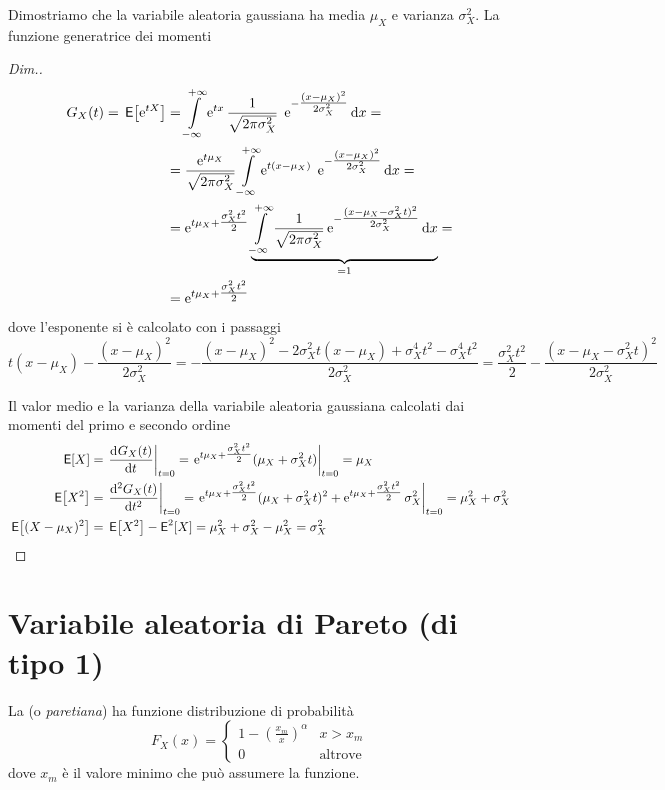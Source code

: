 Dimostriamo che la variabile aleatoria gaussiana ha media $\mu_X$ e varianza $\sigma^2_X$. La funzione generatrice dei momenti
\begin{proof}[Dim.]
\[\begin{split}G_X(t)=\,{\operatorname{\mathsf{E}}}\!\left[{\operatorname{e}^{t X}}\right]&=\int\limits_{-\infty}^{+\infty}{\operatorname{e}^{t x}\frac{1}{\sqrt{2\pi\sigma^2_X}}\;\operatorname{e}^{-\tfrac{(x-\mu_X)^2}{2\sigma^2_X}}}{\,\mathop{}\!\mathrm{d}{x}}=\\
&=\frac{\operatorname{e}^{t\mu_X}}{\sqrt{2\pi\sigma^2_X}}\int\limits_{-\infty}^{+\infty}{\operatorname{e}^{t (x-\mu_X)}\;\operatorname{e}^{-\tfrac{(x-\mu_X)^2}{2\sigma^2_X}}}{\,\mathop{}\!\mathrm{d}{x}}=\\
&=\operatorname{e}^{t\mu_X+\tfrac{\sigma^2_X t^2}{2}}\underbrace{\int\limits_{-\infty}^{+\infty}{\frac{1}{\sqrt{2\pi\sigma^2_X}}\operatorname{e}^{-\tfrac{(x-\mu_X-\sigma^2_X t)^2}{2\sigma^2_X}}}{\,\mathop{}\!\mathrm{d}{x}}}_{=1}=\\
&=\operatorname{e}^{t\mu_X+\tfrac{\sigma^2_X t^2}{2}}\end{split}\]
dove l'esponente si è calcolato con i passaggi
\[t(x-\mu_X)-\frac{(x-\mu_X)^2}{2\sigma^2_X}=-\frac{(x-\mu_X)^2-2\sigma^2_X t(x-\mu_X)+\sigma^4_X t^2-\sigma^4_X t^2}{2\sigma^2_X}=\frac{\sigma^2_X t^2}{2}-\frac{(x-\mu_X-\sigma^2_X t)^2}{2\sigma^2_X}\]

Il valor medio e la varianza della variabile aleatoria gaussiana calcolati dai momenti del primo e secondo ordine
\begin{equation}\begin{split}
\E{X}&=\restrict{\deriv{G_X(t)}{t}}{t=0}=\restrict{\e{t\mu_X+\tfrac{\sigma^2_X t^2}{2}}(\mu_X+\sigma^2_X t)}{t=0}=\mu_X
\\
\E{X^2}&=\restrict{\deriv[2]{G_X(t)}{t}}{t=0}=\restrict{\e{t\mu_X+\tfrac{\sigma^2_X t^2}{2}}(\mu_X+\sigma^2_X t)^2+\e{t\mu_X+\tfrac{\sigma^2_X t^2}{2}}\sigma^2_X}{t=0}=\mu^2_X+\sigma^2_X
\\\E{(X-\mu_X)^2}&=\E{X^2}-\Esp^2[X]=\mu^2_X+\sigma^2_X-\mu^2_X=\sigma^2_X
\end{split}
\end{equation}
\end{proof}

\section{Variabile aleatoria di Pareto (di tipo 1)}
La  (o \emph{paretiana}) ha funzione distribuzione di probabilità
\begin{equation}
	F_X(x) =
	\begin{cases}
		1-\left(\frac{x_m}{x}\right)^\alpha & x > x_m \\
		0 & \text{altrove}
	\end{cases}
\end{equation}
dove $x_m$ è il valore minimo che può assumere la funzione.

